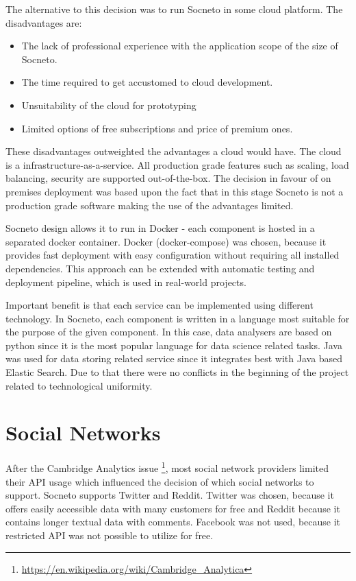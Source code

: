 The alternative to this decision was to run Socneto in some cloud platform. The disadvantages are:
\begin{itemize}
    \item The lack of professional experience with the application scope of the size of Socneto.
    \item The time required to get accustomed to cloud development.
    \item Unsuitability of the cloud for prototyping
    \item Limited options of free subscriptions and price of premium ones.
\end{itemize}
These disadvantages outweighted the advantages a cloud would have. The cloud is a infrastructure-as-a-service. All production grade features such as scaling, load balancing, security are supported out-of-the-box. The decision in favour of on premises deployment was based upon the fact that in this stage Socneto is not a production grade software making the use of the advantages limited.

Socneto design allows it to run in Docker - each component is hosted in a separated docker container. Docker (docker-compose) was chosen, because it provides fast deployment with easy configuration without requiring all installed dependencies. This approach can be extended with automatic testing and deployment pipeline, which is used in real-world projects. 

Important benefit is that each service can be implemented using different technology. In Socneto, each component is written in a language most suitable for the purpose of the given component. In this case, data analysers are based on python since it is the most popular language for data science related tasks. Java was used for data storing related service since it integrates best with Java based Elastic Search. Due to that there were no conflicts in the beginning of the project related to technological uniformity.


\section{Social Networks}
After the Cambridge Analytics issue \footnote{\url{https://en.wikipedia.org/wiki/Cambridge_Analytica}}, most social network providers limited their API usage which influenced the decision of which social networks to support. Socneto supports Twitter and Reddit. Twitter was chosen, because it offers easily accessible data with many customers for free and Reddit because it contains longer textual data with comments. Facebook was not used, because it restricted API was not possible to utilize for free.

